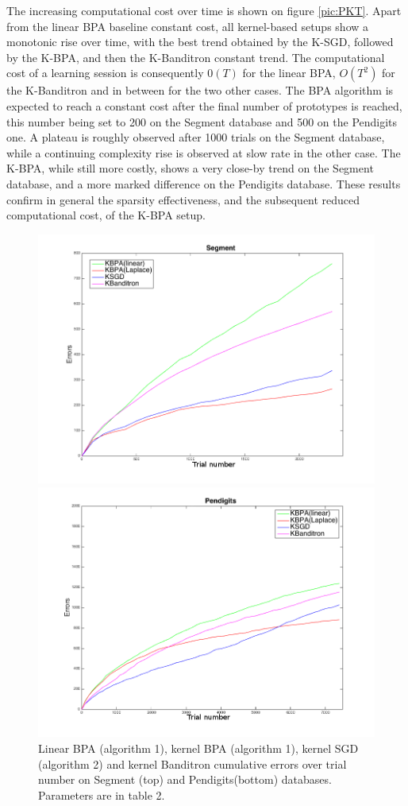 \documentclass[preprint,12pt,authoryear]{elsarticle}
\begin{document}


The increasing computational cost over time is shown on figure \ref{pic:PKT}. Apart from the linear BPA baseline constant cost, all kernel-based setups show a monotonic rise over time, with the best trend obtained by the K-SGD, followed by the K-BPA, and then the K-Banditron constant trend.  The computational cost of a learning session is consequently $0(T)$ for the linear BPA, $O(T^2)$ for the K-Banditron and in between for the two other cases. The BPA algorithm is expected to reach a constant cost after the final number of prototypes is reached, this number being set to 200 on the Segment database and 500  on the Pendigits one. A plateau is roughly observed after 1000 trials on the Segment database, while a continuing complexity rise is observed at slow rate in the other case. The K-BPA, while still more costly, shows a very close-by trend on the Segment database, and a more marked difference on the Pendigits database. These results confirm in general the sparsity effectiveness, and the subsequent reduced computational cost, of the K-BPA setup.


\begin{figure}[htp]
	
	\centerline{
	\includegraphics[width=.7\linewidth]{figs/Segment_kernel_CM.png}}
\centerline{
	\includegraphics[width=.7\linewidth]{figs/Pendigits_kernel_CM.png}}
	\caption{Linear BPA (algorithm 1), kernel BPA (algorithm 1), kernel SGD (algorithm 2)  and kernel Banditron cumulative errors over trial number on Segment  (top) and Pendigits(bottom)  databases. Parameters are in table 2.}
	\label{pic:PKCM}
\end{figure}
\end{document}
